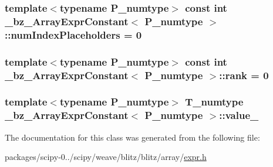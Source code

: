 \subsubsection[{num\+Index\+Placeholders}]{\setlength{\rightskip}{0pt plus 5cm}template$<$typename P\+\_\+numtype$>$ const int {\bf \+\_\+bz\+\_\+\+Array\+Expr\+Constant}$<$ P\+\_\+numtype $>$\+::num\+Index\+Placeholders = 0\hspace{0.3cm}{\ttfamily [static]}}\label{class__bz__ArrayExprConstant_aa157c75baed33a8bb1c351318c99063a}
\hypertarget{class__bz__ArrayExprConstant_a918d9c3c480581be687fee94fa5d61a3}{}
\subsubsection[{rank}]{\setlength{\rightskip}{0pt plus 5cm}template$<$typename P\+\_\+numtype$>$ const int {\bf \+\_\+bz\+\_\+\+Array\+Expr\+Constant}$<$ P\+\_\+numtype $>$\+::rank = 0\hspace{0.3cm}{\ttfamily [static]}}\label{class__bz__ArrayExprConstant_a918d9c3c480581be687fee94fa5d61a3}
\hypertarget{class__bz__ArrayExprConstant_a97616e9804652bf4819682979d016865}{}
\subsubsection[{value\+\_\+}]{\setlength{\rightskip}{0pt plus 5cm}template$<$typename P\+\_\+numtype$>$ {\bf T\+\_\+numtype} {\bf \+\_\+bz\+\_\+\+Array\+Expr\+Constant}$<$ P\+\_\+numtype $>$\+::value\+\_\+\hspace{0.3cm}{\ttfamily [protected]}}\label{class__bz__ArrayExprConstant_a97616e9804652bf4819682979d016865}


The documentation for this class was generated from the following file\+:\begin{DoxyCompactItemize}
\item 
packages/scipy-\/0../scipy/weave/blitz/blitz/array/\hyperlink{expr_8h}{expr.\+h}\end{DoxyCompactItemize}
